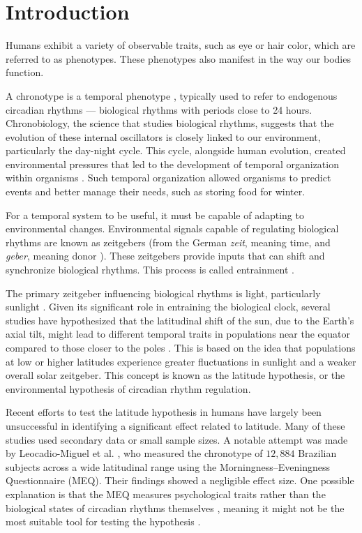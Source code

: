 \documentclass[
12pt,
openright,
oneside,
a4paper,
chapter=TITLE,
section=TITLE,
french,
spanish,
brazil,
english
]{abntex2}
\begin{document}
\section{Introduction}\label{introduction-1}

Humans exhibit a variety of observable traits, such as eye or hair
color, which are referred to as phenotypes. These phenotypes also
manifest in the way our bodies function.

A chronotype is a temporal phenotype
\autocite{ehret1974,pittendrigh1993}, typically used to refer to
endogenous circadian rhythms --- biological rhythms with periods close
to 24 hours. Chronobiology, the science that studies biological rhythms,
suggests that the evolution of these internal oscillators is closely
linked to our environment, particularly the day-night cycle. This cycle,
alongside human evolution, created environmental pressures that led to
the development of temporal organization within organisms
\autocite{aschoff1989,paranjpe2005}. Such temporal organization allowed
organisms to predict events and better manage their needs, such as
storing food for winter.

For a temporal system to be useful, it must be capable of adapting to
environmental changes. Environmental signals capable of regulating
biological rhythms are known as zeitgebers (from the German \emph{zeit},
meaning time, and \emph{geber}, meaning donor
\autocite{cambridgeuniversitypress}). These zeitgebers provide inputs
that can shift and synchronize biological rhythms. This process is
called entrainment \autocite{roenneberg2003a,roenneberg2010}.

The primary zeitgeber influencing biological rhythms is light,
particularly sunlight \autocite{aschoff1972}. Given its significant role
in entraining the biological clock, several studies have hypothesized
that the latitudinal shift of the sun, due to the Earth's axial tilt,
might lead to different temporal traits in populations near the equator
compared to those closer to the poles
\autocite{bohlen1973,pittendrigh1991,roenneberg2003,randler2008,hut2013,leocadio-miguel2017,randler2017}.
This is based on the idea that populations at low or higher latitudes
experience greater fluctuations in sunlight and a weaker overall solar
zeitgeber. This concept is known as the latitude hypothesis, or the
environmental hypothesis of circadian rhythm regulation.

Recent efforts to test the latitude hypothesis in humans have largely
been unsuccessful in identifying a significant effect related to
latitude. Many of these studies used secondary data or small sample
sizes. A notable attempt was made by Leocadio-Miguel et al.
\autocite*{leocadio-miguel2017}, who measured the chronotype of
\(12,884\) Brazilian subjects across a wide latitudinal range using the
Morningness--Eveningness Questionnaire (MEQ). Their findings showed a
negligible effect size. One possible explanation is that the MEQ
measures psychological traits rather than the biological states of
circadian rhythms themselves \autocite{roenneberg2019}, meaning it might
not be the most suitable tool for testing the hypothesis
\autocite{leocadio-miguel2014}.
\end{document}
